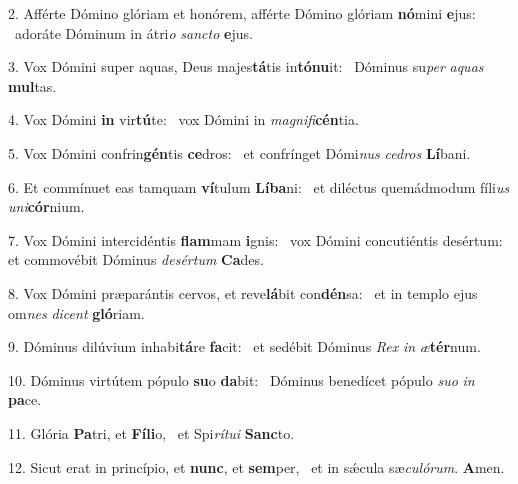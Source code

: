 2. Afférte Dómino glóriam et honórem, afférte Dómino glóriam \textbf{nó}mini \textbf{e}jus: \ast\  adoráte Dóminum in átri\textit{o} \textit{sanc}\textit{to} \textbf{e}jus.\

3. Vox Dómini super aquas, Deus majes\textbf{tá}tis in\textbf{tó}\textbf{nu}it: \ast\  Dóminus su\textit{per} \textit{a}\textit{quas} \textbf{mul}tas.\

4. Vox Dómini \textbf{in} vir\textbf{tú}te: \ast\  vox Dómini in \textit{ma}\textit{gni}\textit{fi}\textbf{cén}tia.\

5. Vox Dómini confrin\textbf{gén}tis \textbf{ce}dros: \ast\  et confrínget Dómi\textit{nus} \textit{ce}\textit{dros} \textbf{Lí}bani.\

6. Et commínuet eas tamquam \textbf{ví}tulum \textbf{Lí}\textbf{ba}ni: \ast\  et diléctus quemádmodum fíli\textit{us} \textit{u}\textit{ni}\textbf{cór}nium.\

7. Vox Dómini intercidéntis \textbf{flam}mam \textbf{i}gnis: \ast\  vox Dómini concutiéntis desértum: et commovébit Dóminus \textit{de}\textit{sér}\textit{tum} \textbf{Ca}des.\

8. Vox Dómini præparántis cervos, et reve\textbf{lá}bit con\textbf{dén}sa: \ast\  et in templo ejus om\textit{nes} \textit{di}\textit{cent} \textbf{gló}riam.\

9. Dóminus dilúvium inhabi\textbf{tá}re \textbf{fa}cit: \ast\  et sedébit Dóminus \textit{Rex} \textit{in} \textit{æ}\textbf{tér}num.\

10. Dóminus virtútem pópulo \textbf{su}o \textbf{da}bit: \ast\  Dóminus benedícet pópulo \textit{su}\textit{o} \textit{in} \textbf{pa}ce.\

11. Glória \textbf{Pa}tri, et \textbf{Fí}\textbf{li}o, \ast\  et Spi\textit{rí}\textit{tu}\textit{i} \textbf{Sanc}to.\

12. Sicut erat in princípio, et \textbf{nunc}, et \textbf{sem}per, \ast\  et in sǽcula sæ\textit{cu}\textit{ló}\textit{rum}. \textbf{A}men.\

